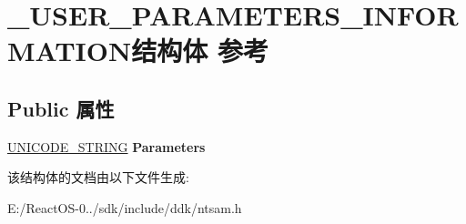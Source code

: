 \hypertarget{struct___u_s_e_r___p_a_r_a_m_e_t_e_r_s___i_n_f_o_r_m_a_t_i_o_n}{}\section{\+\_\+\+U\+S\+E\+R\+\_\+\+P\+A\+R\+A\+M\+E\+T\+E\+R\+S\+\_\+\+I\+N\+F\+O\+R\+M\+A\+T\+I\+O\+N结构体 参考}
\label{struct___u_s_e_r___p_a_r_a_m_e_t_e_r_s___i_n_f_o_r_m_a_t_i_o_n}
\subsection*{Public 属性}
\begin{DoxyCompactItemize}
\item 
\mbox{\label{struct___u_s_e_r___p_a_r_a_m_e_t_e_r_s___i_n_f_o_r_m_a_t_i_o_n_a1e7176994b64d36eab15049db56831a4}} 
\hyperlink{struct___u_n_i_c_o_d_e___s_t_r_i_n_g}{U\+N\+I\+C\+O\+D\+E\+\_\+\+S\+T\+R\+I\+NG} {\bfseries Parameters}
\end{DoxyCompactItemize}


该结构体的文档由以下文件生成\+:\begin{DoxyCompactItemize}
\item 
E\+:/\+React\+O\+S-\/0../sdk/include/ddk/ntsam.\+h\end{DoxyCompactItemize}
